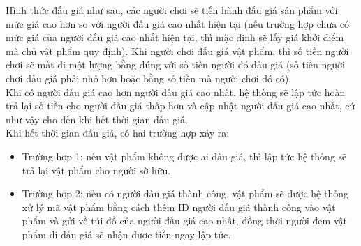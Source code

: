 \documentclass[a4paper]{article}
\begin{document}
Hình thức đấu giá như sau, các người chơi sẽ tiến hành đấu giá sản phẩm với mức giá cao hơn so với người đấu giá cao nhất hiện tại (nếu trường hợp chưa có mức giá của người đấu giá cao nhất hiện tại, thì mặc định sẽ lấy giá khởi điểm mà chủ vật phẩm quy định). Khi người chơi đấu giá vật phẩm, thì số tiền người chơi sẽ mất đi một lượng bằng đúng với số tiền người đó đấu giá (số tiền người chơi đấu giá phải nhỏ hơn hoặc bằng số tiền mà người chơi đó có). \\

Khi có người đấu giá cao hơn người đấu giá cao nhất, hệ thống sẽ lập tức hoàn trả lại số tiền cho người đấu giá thấp hơn và cập nhật người đấu giá cao nhất, cứ như vậy cho đến khi hết thời gian đấu giá. \\



Khi hết thời gian đấu giá, có hai trường hợp xảy ra: 
\begin{itemize}
    \item Trường hợp 1: nếu vật phẩm không được ai đấu giá, thì lập tức hệ thống sẽ trả lại vật phẩm cho người sỡ hữu. 
    \item Trường hợp 2: nếu có người đấu giá thành công, vật phẩm sẽ được hệ thống xử lý mã vật phẩm bằng cách thêm ID người đấu giá thành công vào vật phẩm và gửi về túi đồ của người đấu giá cao nhất, đồng thời người đem vật phẩm đi đấu giá sẽ nhận được tiền ngay lập tức.
\end{itemize}
\end{document}
